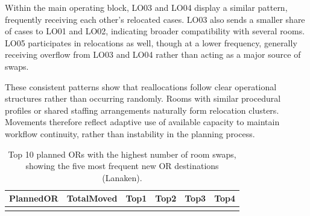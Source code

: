 \documentclass[
]{article}
\begin{document}
Within the main operating block, LO03 and LO04 display a similar
pattern, frequently receiving each other's relocated cases. LO03 also
sends a smaller share of cases to LO01 and LO02, indicating broader
compatibility with several rooms. LO05 participates in relocations as
well, though at a lower frequency, generally receiving overflow from
LO03 and LO04 rather than acting as a major source of swaps.

These consistent patterns show that reallocations follow clear
operational structures rather than occurring randomly. Rooms with
similar procedural profiles or shared staffing arrangements naturally
form relocation clusters. Movements therefore reflect adaptive use of
available capacity to maintain workflow continuity, rather than
instability in the planning process.

\begin{longtable}[]{@{}
  >{\centering\arraybackslash}p{}
  >{\centering\arraybackslash}p{}
  >{\centering\arraybackslash}p{}
  >{\centering\arraybackslash}p{}
  >{\centering\arraybackslash}p{}
  >{\centering\arraybackslash}p{}@{}}
\caption{Top 10 planned ORs with the highest number of room swaps,
showing the five most frequent new OR destinations (Lanaken).
\label{tab:room_swap_or}}\tabularnewline
\toprule\noalign{}
\begin{minipage}[b]{\linewidth}\centering
PlannedOR
\end{minipage} & \begin{minipage}[b]{\linewidth}\centering
TotalMoved
\end{minipage} & \begin{minipage}[b]{\linewidth}\centering
Top1
\end{minipage} & \begin{minipage}[b]{\linewidth}\centering
Top2
\end{minipage} & \begin{minipage}[b]{\linewidth}\centering
Top3
\end{minipage} & \begin{minipage}[b]{\linewidth}\centering
Top4
\end{minipage} \\
\midrule\noalign{}
\endfirsthead
\toprule\noalign{}
\begin{minipage}[b]{\linewidth}\centering

\end{minipage}
\end{longtable}
\end{document}
